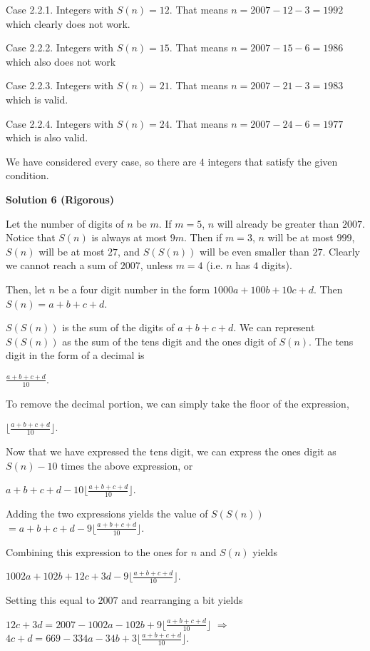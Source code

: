 \begin{enumerate}
 Case 2.2.1. Integers with $S(n)=12$. That means $n=2007-12-3=1992$ which clearly does not work.

 Case 2.2.2. Integers with $S(n)=15$. That means $n=2007-15-6=1986$ which also does not work

 Case 2.2.3. Integers with $S(n)=21$. That means $n=2007-21-3=1983$ which is valid.

 Case 2.2.4. Integers with $S(n)=24$. That means $n=2007-24-6=1977$ which is also valid.

 We have considered every case, so there are $\boxed{4}$ integers that satisfy the given condition.

 



\textbf{Solution 6 (Rigorous)}

Let the number of digits of $n$ be $m$. If $m = 5$, $n$ will already be greater than $2007$. Notice that $S(n)$ is always at most $9m$. Then if $m = 3$, $n$ will be at most $999$, $S(n)$ will be at most $27$, and $S(S(n))$ will be even smaller than $27$. Clearly we cannot reach a sum of $2007$, unless $m = 4$ (i.e. $n$ has $4$ digits).

 Then, let $n$ be a four digit number in the form $1000a + 100b + 10c + d$. Then $S(n) = a + b + c + d$.

 $S(S(n))$ is the sum of the digits of $a + b + c + d$. We can represent $S(S(n))$ as the sum of the tens digit and the ones digit of $S(n)$. The tens digit in the form of a decimal is

 
$\frac{a + b + c + d}{10}$.

 
To remove the decimal portion, we can simply take the floor of the expression,

 
$\lfloor\frac{a + b + c + d}{10}\rfloor$.

 
Now that we have expressed the tens digit, we can express the ones digit as $S(n) -10$ times the above expression, or

 
$a + b + c + d - 10\lfloor\frac{a + b + c + d}{10}\rfloor$.

 
Adding the two expressions yields the value of $S(S(n))$
$= a + b + c + d - 9\lfloor\frac{a + b + c + d}{10}\rfloor$.

 
Combining this expression to the ones for $n$ and $S(n)$ yields

 
$1002a + 102b + 12c + 3d - 9\lfloor\frac{a + b + c + d}{10}\rfloor$.

 
Setting this equal to $2007$ and rearranging a bit yields

 
$12c + 3d = 2007 - 1002a - 102b + 9\lfloor\frac{a + b + c + d}{10}\rfloor$
$\Rightarrow$ $4c + d = 669 - 334a - 34b + 3\lfloor\frac{a + b + c + d}{10}\rfloor$.


\end{enumerate}
